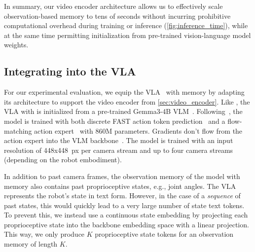 In summary, our video encoder architecture allows us to effectively scale observation-based memory to tens of seconds without incurring prohibitive computational overhead during training or inference (\cref{fig:inference_time}), while at the same time permitting initialization from pre-trained vision-language model weights.









\subsection{Integrating \Acronym{} into the \pizerosix{} VLA}
\label{sec:memory_vla}

For our experimental evaluation, we equip the \pizerosix{} VLA~\cite{intelligence2025pi} with \Acronym{} memory by adapting its architecture to support the video encoder from \cref{sec:video_encoder}.
Like \pizerosix{}, the \pizerosix{} VLA with \Acronym{} is initialized from a pre-trained Gemma3-4B VLM~\citep{kamath2025gemma}.
Following~\citet{driess2025knowledge}, the model is trained with both discrete FAST action token prediction~\citep{pertsch2025fast} and a flow-matching action expert~\citep{blackpi0} with 860M parameters.
Gradients don't flow from the action expert into the VLM backbone~\citep{driess2025knowledge}. The model is trained with an input resolution of 448x448~px per camera stream and up to four camera streams (depending on the robot embodiment).

In addition to past camera frames, the observation memory of the \pizerosix{} model with \Acronym{} memory also contains past proprioceptive states, e.g., joint angles. The \pizerosix{} VLA represents the robot's state in text form. However, in the case of a \emph{sequence} of past states, this would quickly lead to a very large number of state text tokens. 
To prevent this, we instead use a continuous state embedding by projecting each proprioceptive state into the backbone embedding space with a linear projection.
This way, we only produce $K$ proprioceptive state tokens for an observation memory of length $K$.

